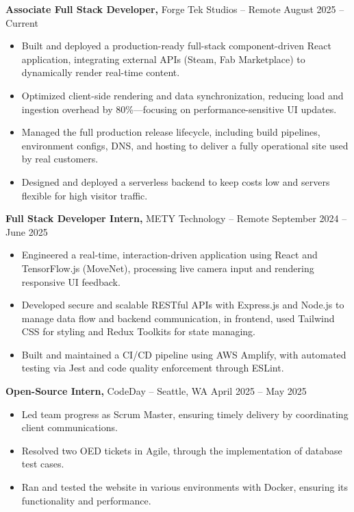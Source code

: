 \documentclass[11pt]{article}       %
\begin{document}
\textbf{Associate Full Stack Developer,} {Forge Tek Studios} -- Remote \hfill August 2025 -- Current 
\vspace{-9pt}
\begin{itemize}
  \item Built and deployed a production-ready full-stack component-driven React application, integrating external APIs (Steam, Fab Marketplace) to dynamically render real-time content.
  \item Optimized client-side rendering and data synchronization, reducing load and ingestion overhead by 80\%—focusing on performance-sensitive UI updates.
  \item Managed the full production release lifecycle, including build pipelines, environment configs, DNS, and hosting to deliver a fully operational site used by real customers.
  \item Designed and deployed a serverless backend to keep costs low and servers flexible for high visitor traffic.
\end{itemize}

\textbf{Full Stack Developer Intern,} {METY Technology} -- Remote \hfill September 2024 -- June 2025 
\vspace{-9pt}
\begin{itemize}
  \item Engineered a real-time, interaction-driven application using React and TensorFlow.js (MoveNet), processing live camera input and rendering responsive UI feedback.
  \item Developed secure and scalable RESTful APIs with Express.js and Node.js to manage data flow and backend communication, in frontend, used Tailwind CSS for styling and Redux Toolkits for state managing.
  \item Built and maintained a CI/CD pipeline using AWS Amplify, with automated testing via Jest and code quality enforcement through ESLint.
\end{itemize}

\textbf{Open-Source Intern,} {CodeDay} -- Seattle, WA \hfill April 2025 -- May 2025 \\
\vspace{-9pt}
\begin{itemize}
  \item Led team progress as Scrum Master, ensuring timely delivery by coordinating client communications.
  \item Resolved two OED tickets in Agile, through the implementation of database test cases.
  \item Ran and tested the website in various environments with Docker, ensuring its functionality and performance.
\end{itemize}
\end{document}
